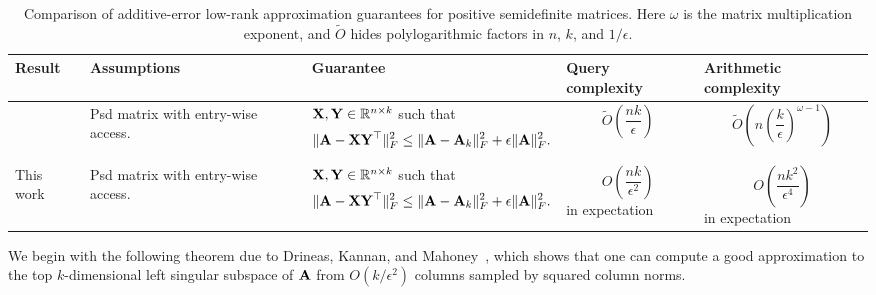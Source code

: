 \begin{table}[H]
\centering
\small
\renewcommand{\arraystretch}{1.25}
\begin{adjustbox}{max width=\textwidth}
\begin{tabular}{@{}L{0.10\textwidth}L{0.23\textwidth}L{0.35\textwidth}C{0.2\textwidth}C{0.2\textwidth}@{}}
\toprule
Result
&
Assumptions
&
Guarantee
&
Query complexity
&
Arithmetic complexity
\\
\midrule
\cite{bakshi_robust_2020}
&
Psd matrix with entry-wise access.
&
\(\mathbf{X},\mathbf{Y}\in\mathbb{R}^{n\times k}\) such that
\[
    \|\mathbf{A}-\mathbf{X}\mathbf{Y}^\top\|_F^2
    \leq
    \|\mathbf{A}-\mathbf{A}_k\|_F^2
    +
    \epsilon\|\mathbf{A}\|_F^2 .
\]
&
\[
    \widetilde O\!\left(
        \frac{nk}{\epsilon}
    \right)
\]
&
\[
    \widetilde O\!\left(
        n\left(\frac{k}{\epsilon}\right)^{\omega-1}
    \right)
\]
\\
\midrule
This work
&
Psd matrix with entry-wise access. 
&
\(\mathbf{X},\mathbf{Y}\in\mathbb{R}^{n\times k}\) such that
\[
    \|\mathbf{A}-\mathbf{X}\mathbf{Y}^\top\|_F^2
    \leq
    \|\mathbf{A}-\mathbf{A}_k\|_F^2
    +
    \epsilon\|\mathbf{A}\|_F^2 .
\]
&
\[
    O\!\left(
        \frac{nk}{\epsilon^2}
    \right)
\]
in expectation
&
\[
    O\!\left(
        \frac{nk^2}{\epsilon^4}
    \right)
\]
in expectation
\\
\bottomrule
\end{tabular}
\end{adjustbox}
\caption{Comparison of additive-error low-rank approximation guarantees for
positive semidefinite matrices. Here \(\omega\) is the matrix multiplication
exponent, and \(\widetilde O\) hides polylogarithmic factors in $n$, $k$, and $1/\epsilon$.}
\label{tab:additive-lra-comparison}
\end{table}


We begin with the following theorem due to Drineas, Kannan, and Mahoney~\cite{drineas_fast_2006-1}, which shows that one can compute a good approximation to the top $k$-dimensional left singular subspace of $\mathbf{A}$ from $O(k/\epsilon^2)$ columns sampled by squared column norms.

